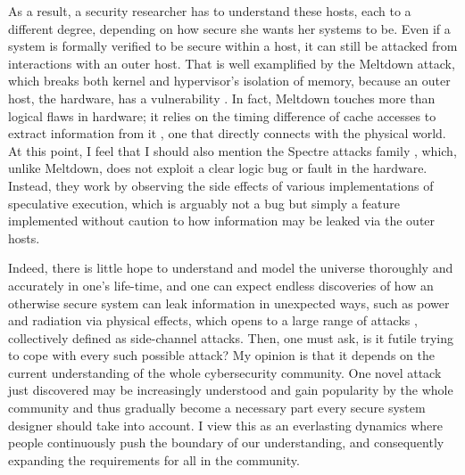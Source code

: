 \documentclass[10pt]{article}
\begin{document}
As a result, a security researcher has to understand these hosts, each to a
different degree, depending on how secure she wants her systems to be. Even if
a system is formally verified to be secure within a host, it can still be
attacked from interactions with an outer host. That is well examplified by
the Meltdown attack, which breaks both kernel and hypervisor's isolation of
memory, because an outer host, the hardware, has a vulnerability
\cite{meltdown}. In fact, Meltdown touches more than logical flaws in hardware;
it relies on the timing difference of cache accesses to extract information
from it \cite{flush.reload}, one that directly connects with the physical
world. At this point, I feel that I should also mention the Spectre attacks
family \cite{spectre}, which, unlike Meltdown, does not exploit a clear logic
bug or fault in the hardware. Instead, they work by observing the side effects
of various implementations of speculative execution, which is arguably not a
bug but simply a feature implemented without caution to how information may be
leaked via the outer hosts.

Indeed, there is little hope to understand and model the universe thoroughly
and accurately in one's life-time, and one can expect endless discoveries of
how an otherwise secure system can leak information in unexpected ways, such as
power and radiation via physical effects, which opens to a large range of
attacks \cite{side.channel.1, side.channel.2, side.channel.3, flush.reload},
collectively defined as side-channel attacks.  Then, one must ask, is it futile
trying to cope with every such possible attack? My opinion is that it depends
on the current understanding of the whole cybersecurity community. One novel
attack just discovered may be increasingly understood and gain popularity by
the whole community and thus gradually become a necessary part every secure
system designer should take into account. I view this as an everlasting
dynamics where people continuously push the boundary of our understanding, and
consequently expanding the requirements for all in the community.
\end{document}
